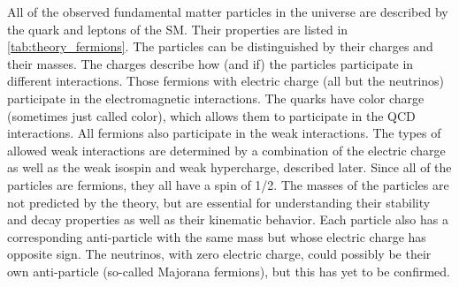 All of the 
observed fundamental 
matter particles in the universe are described by the quark
and leptons of the SM. Their properties are listed 
in \tab\ref{tab:theory_fermions}. 
The particles can be distinguished
by their charges and their masses.
The charges describe how (and if) the particles participate in
different interactions.
Those fermions with electric charge (all but the neutrinos) 
participate in the electromagnetic
interactions. The quarks have color charge (sometimes 
just called color), which allows them to 
participate in the QCD interactions. All fermions also participate in 
the weak interactions. The types of allowed weak interactions are determined
by a combination of the electric charge as well as the weak isospin
and weak hypercharge, described later.
Since all of the particles are fermions, they all have a spin of 1/2.
The masses of the particles are not predicted by the theory, but 
are essential for understanding their stability and decay properties
as well as their kinematic behavior.
Each particle also has a corresponding anti-particle with the same mass but
whose electric charge has opposite sign. The neutrinos, with zero 
electric charge, could possibly be their own 
anti-particle (so-called Majorana fermions), but
this has yet to be confirmed.

